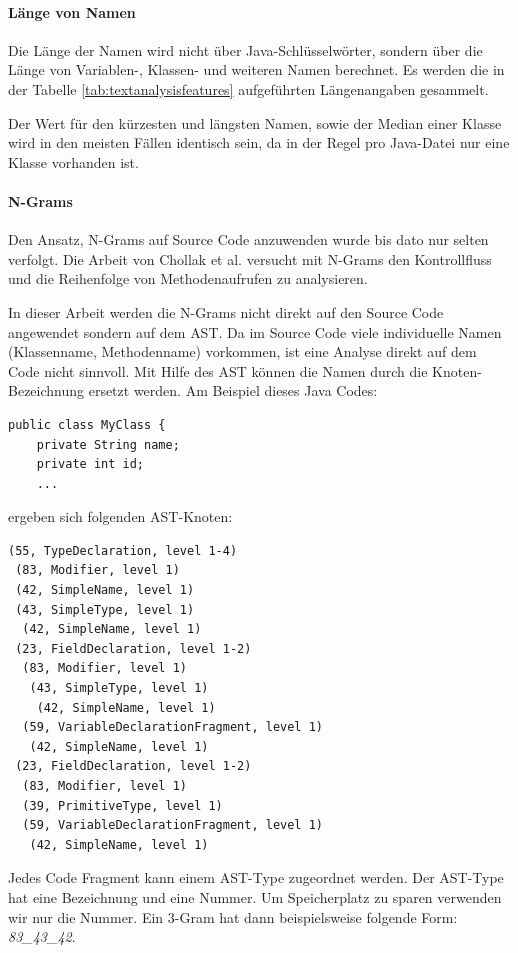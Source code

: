 \documentclass[10pt, a4paper]{article}
\begin{document}
\paragraph{Länge von Namen}
Die Länge der Namen wird nicht über Java-Schlüs\-selwör\-ter, sondern über die Län\-ge von Variablen-, Klassen- und weiteren Namen berechnet. Es werden die in der Tabelle \ref{tab:textanalysisfeatures} aufgeführten Län\-gen\-an\-ga\-ben gesammelt.

Der Wert für den kürzesten und längsten Namen, sowie der Median einer Klasse wird in den meisten Fällen identisch sein, da in der Regel pro Java-Datei nur eine Klasse vorhanden ist.

\paragraph{N-Grams} \label{par:ngrams}
Den Ansatz, N-Grams auf Source Code anzuwenden wurde bis dato nur selten verfolgt. Die Arbeit von Chollak et al. \cite{softwarebugswithngrams} versucht mit N-Grams den Kontrollfluss und die Reihenfolge von Methodenaufrufen zu analysieren.

In dieser Arbeit werden die N-Grams nicht direkt auf den Source Code angewendet sondern auf dem \acf{AST}. Da im Source Code viele individuelle Namen (Klassenname, Methodenname) vorkommen, ist eine Analyse direkt auf dem Code nicht sinnvoll. Mit Hilfe des \ac{AST} können die Namen durch die Knoten-Bezeichnung ersetzt werden. Am Beispiel dieses Java Codes:
\begin{lstlisting}[frame=single,caption={Java Source Code}]
public class MyClass {
	private String name;
	private int id;
	...
\end{lstlisting}
ergeben sich folgenden \ac{AST}-Knoten:

\begin{lstlisting}[frame=single,caption={AST Elemente mit Levels},label={lst:astwithlevels}]
(55, TypeDeclaration, level 1-4)
 (83, Modifier, level 1)
 (42, SimpleName, level 1)
 (43, SimpleType, level 1)
  (42, SimpleName, level 1)
 (23, FieldDeclaration, level 1-2)
  (83, Modifier, level 1)
   (43, SimpleType, level 1)
    (42, SimpleName, level 1)
  (59, VariableDeclarationFragment, level 1)
   (42, SimpleName, level 1)
 (23, FieldDeclaration, level 1-2)
  (83, Modifier, level 1)
  (39, PrimitiveType, level 1)
  (59, VariableDeclarationFragment, level 1)
   (42, SimpleName, level 1)
\end{lstlisting}

Jedes Code Fragment kann einem AST-Type zugeordnet werden. Der AST-Type hat eine Bezeichnung und eine Nummer. Um Speicherplatz zu sparen verwenden wir nur die Nummer. Ein 3-Gram hat dann beispielsweise folgende Form: \emph{83\_43\_42}.
\end{document}
